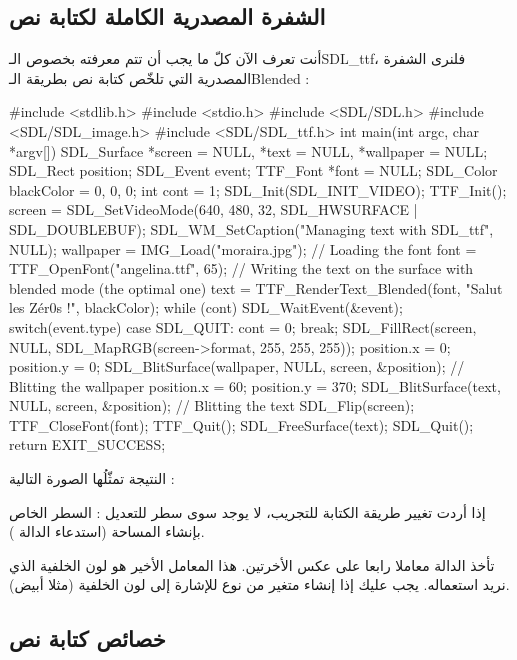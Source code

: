 \subsection{الشفرة المصدرية الكاملة لكتابة نص}

أنت تعرف الآن كلّ ما يجب أن تتم معرفته بخصوص الـ\textenglish{SDL\_ttf}،
فلنرى الشفرة المصدرية التي تلخّص كتابة نص بطريقة الـ\textenglish{Blended} :

\begin{Csource}
#include <stdlib.h>
#include <stdio.h>
#include <SDL/SDL.h>
#include <SDL/SDL_image.h>
#include <SDL/SDL_ttf.h>
int main(int argc, char *argv[])
{
	SDL_Surface *screen = NULL, *text = NULL, *wallpaper = NULL;
	SDL_Rect position;
	SDL_Event event;
	TTF_Font *font = NULL;
	SDL_Color blackColor = {0, 0, 0};
	int cont = 1;
	SDL_Init(SDL_INIT_VIDEO);
	TTF_Init();	
	screen = SDL_SetVideoMode(640, 480, 32, SDL_HWSURFACE | SDL_DOUBLEBUF);
	SDL_WM_SetCaption("Managing text with SDL_ttf", NULL);
	wallpaper = IMG_Load("moraira.jpg");
	// Loading the font 
	font = TTF_OpenFont("angelina.ttf", 65);
	// Writing the text on the surface with blended mode (the optimal one)
	text = TTF_RenderText_Blended(font, "Salut les Zér0s !", blackColor);
	while (cont)	
	{
		SDL_WaitEvent(&event);
		switch(event.type)
		{
			case SDL_QUIT:
			cont = 0;
			break;
		}
		SDL_FillRect(screen, NULL, SDL_MapRGB(screen->format, 255, 255, 255));
		position.x = 0;
		position.y = 0;
		SDL_BlitSurface(wallpaper, NULL, screen, &position); // Blitting the wallpaper
		position.x = 60;
		position.y = 370;
		SDL_BlitSurface(text, NULL, screen, &position); // Blitting the text
		SDL_Flip(screen);
	}
	TTF_CloseFont(font);
	TTF_Quit();
	SDL_FreeSurface(text);
	SDL_Quit();
	return EXIT_SUCCESS;
}
\end{Csource}

النتيجة تمثّلُها الصورة التالية :


إذا أردت تغيير طريقة الكتابة للتجريب، لا يوجد سوى سطر للتعديل : السطر الخاص بإنشاء المساحة (استدعاء الدالة 
).

\begin{warning}
تأخذ الدالة
معاملا رابعا على عكس الأخرتين. هذا المعامل الأخير هو لون الخلفية الذي نريد استعماله. يجب عليك إذا إنشاء متغير من نوع
للإشارة إلى لون الخلفية (مثلا أبيض).
\end{warning}

\subsection{خصائص كتابة نص}

